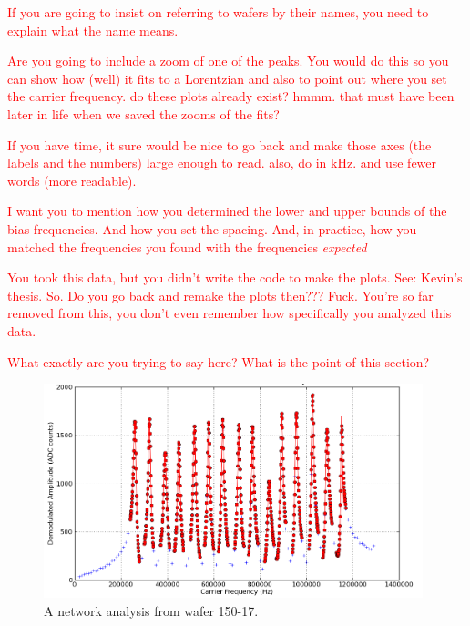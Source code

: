 \textcolor{red}{If you are going to insist on referring to wafers by their names, you need to explain what the name means.}

\textcolor{red}{Are you going to include a zoom of one of the peaks. You would do this so you can show how (well) it fits to a Lorentzian and also to point out where you set the carrier frequency. do these plots already exist? hmmm. that must have been later in life when we saved the zooms of the fits?}

\textcolor{red}{If you have time, it sure would be nice to go back and make those axes (the labels and the numbers) large enough to read. also, do in kHz. and use fewer words (more readable).}

\textcolor{red}{I want you to mention how you determined the lower and upper bounds of the bias frequencies. And how you set the spacing. And, in practice, how you matched the frequencies you found with the frequencies \textit{expected}}

\textcolor{red}{You took this data, but you didn't write the code to make the plots. See: Kevin's thesis. So. Do you go back and remake the plots then??? Fuck. You're so far removed from this, you don't even remember how specifically you analyzed this data.}

\textcolor{red}{What exactly are you trying to say here? What is the point of this section?}


\begin{figure}[htbp]
\begin{center}
\includegraphics[width=0.98\textwidth]{figures/150-17_SqCh3_netanal_600mK.png}
\caption{A network analysis from wafer 150-17.
\label{fig:network_analysis} }
\end{center}
\end{figure}

